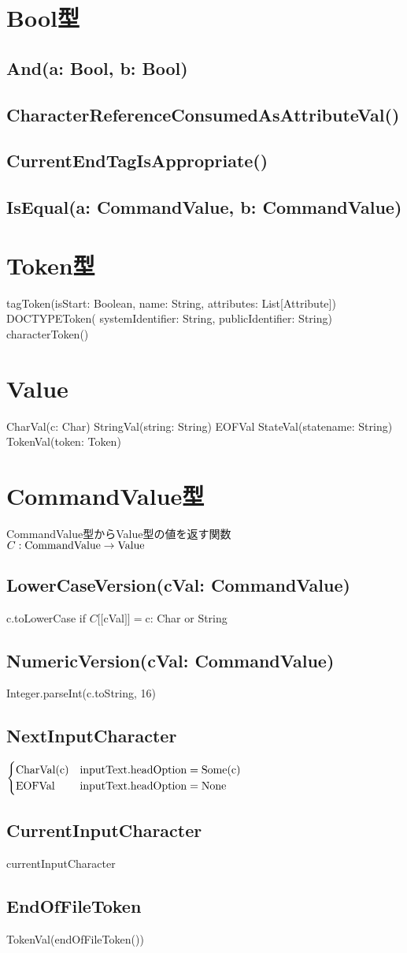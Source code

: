 \documentclass[uplatex,a4j]{jsreport}
\begin{document}
\section{Bool型}
\subsection*{And(a: Bool, b: Bool)}
\subsection*{CharacterReferenceConsumedAsAttributeVal()}
\subsection*{CurrentEndTagIsAppropriate()}
\subsection*{IsEqual(a: CommandValue, b: CommandValue)}

\section{Token型}
tagToken(isStart: Boolean, name: String, attributes: List[Attribute])
DOCTYPEToken( systemIdentifier: String, publicIdentifier: String)
characterToken()
\section{Value}
CharVal(c: Char)
StringVal(string: String)
EOFVal
StateVal(statename: String)
TokenVal(token: Token)

\section{CommandValue型}
CommandValue型からValue型の値を返す関数\\
$C : {\rm CommandValue} \rightarrow {\rm Value} $\\
\subsection*{LowerCaseVersion(cVal: CommandValue)}
c.toLowerCase if $C[\![$cVal$]\!] = $c: Char or String
\subsection*{NumericVersion(cVal: CommandValue)}
Integer.parseInt(c.toString, 16)
\subsection*{NextInputCharacter}
$
\begin{cases}
    {\rm CharVal(c)} & {\rm inputText.headOption} = {\rm Some(c)} \\
    {\rm EOFVal} & {\rm inputText.headOption} = {\rm None}
\end{cases}
$
\subsection*{CurrentInputCharacter}
currentInputCharacter
\subsection*{EndOfFileToken}
TokenVal(endOfFileToken())
\end{document}
